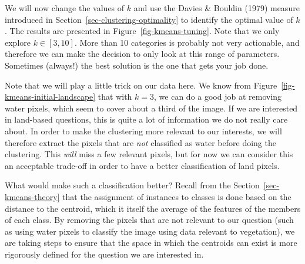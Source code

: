 \documentclass[
  letterpaper,
]{scrbook}
\begin{document}
We will now change the values of \(k\) and use the Davies \& Bouldin
(1979) measure introduced in Section~\ref{sec-clustering-optimality} to
identify the optimal value of \(k\). The results are presented in
Figure~\ref{fig-kmeans-tuning}. Note that we only explore
\(k \in [3, 10]\). More than 10 categories is probably not very
actionable, and therefore we can make the decision to only look at this
range of parameters. Sometimes (always!) the best solution is the one
that gets your job done.

Note that we will play a little trick on our data here. We know from
Figure~\ref{fig-kmeans-initial-landscape} that with \(k=3\), we can do a
good job at removing water pixels, which seem to cover about a third of
the image. If we are interested in land-based questions, this is quite a
lot of information we do not really care about. In order to make the
clustering more relevant to our interests, we will therefore extract the
pixels that are \emph{not} classified as water before doing the
clustering. This \emph{will} miss a few relevant pixels, but for now we
can consider this an acceptable trade-off in order to have a better
classification of land pixels.

What would make such a classification better? Recall from the
Section~\ref{sec-kmeans-theory} that the assignment of instances to
classes is done based on the distance to the centroid, which it itself
the average of the features of the members of each class. By removing
the pixels that are not relevant to our question (such as using water
pixels to classify the image using data relevant to vegetation), we are
taking steps to ensure that the space in which the centroids can exist
is more rigorously defined for the question we are interested in.
\end{document}
